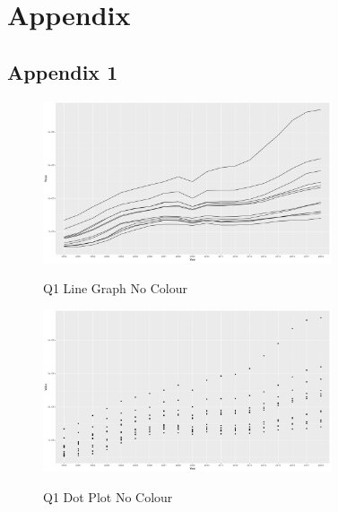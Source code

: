 \documentclass{article}
\begin{document}


\vfill\pagebreak
\printbibliography


\vfill\pagebreak
\vfill\pagebreak

\section*{Appendix}
\subsection{Appendix 1}
\begin{figure}[H]
  \begin{minipage}[b]{1.0\linewidth}
    \centering
    \centerline{\includegraphics[width=8.5cm]{Q1Geom_line_no_colour}}
    \centerline{Q1 Line Graph No Colour}\medskip
  \end{minipage}
\end{figure}

\begin{figure}[H]
  \begin{minipage}[b]{1.0\linewidth}
    \centering
    \centerline{\includegraphics[width=8.5cm]{Q1Geom_point_no_colour}}
    \centerline{Q1 Dot Plot No Colour}\medskip
  \end{minipage}
\end{figure}
\end{document}
